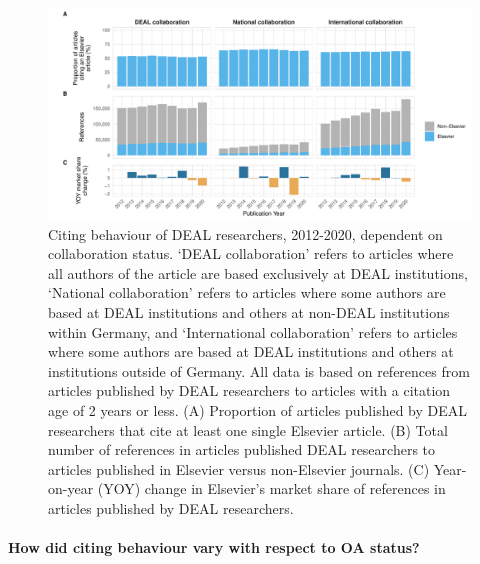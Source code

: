 \documentclass[
]{article}
\begin{document}
\begin{figure}
\centering
\includegraphics{analysis_files/figure-latex/references-publisher-year-collaboration-1.pdf}
\caption{\label{fig:references-publisher-year-collaboration}Citing behaviour of DEAL researchers, 2012-2020, dependent on collaboration status. `DEAL collaboration' refers to articles where all authors of the article are based exclusively at DEAL institutions, `National collaboration' refers to articles where some authors are based at DEAL institutions and others at non-DEAL institutions within Germany, and `International collaboration' refers to articles where some authors are based at DEAL institutions and others at institutions outside of Germany. All data is based on references from articles published by DEAL researchers to articles with a citation age of 2 years or less. (A) Proportion of articles published by DEAL researchers that cite at least one single Elsevier article. (B) Total number of references in articles published DEAL researchers to articles published in Elsevier versus non-Elsevier journals. (C) Year-on-year (YOY) change in Elsevier's market share of references in articles published by DEAL researchers.}
\end{figure}

\hypertarget{how-did-citing-behaviour-vary-with-respect-to-oa-status}{%
\paragraph{How did citing behaviour vary with respect to OA status?}\label{how-did-citing-behaviour-vary-with-respect-to-oa-status}}
\end{document}
